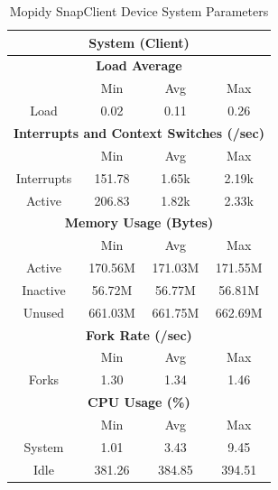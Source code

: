 \documentclass[11pt,a4paper,headinclude=false,footinclude=false]{scrreprt}
\begin{document}
\begin{table}[H]
\centering
    \begin{tabular}{||c|c|c|c|c|c|c||}
    \hline
    \multicolumn{7}{|c|}{\textbf{System (Client)}} \\
    \hline
    \multicolumn{7}{|c|}{\textbf{Load Average}} \\
    \hline\hline
      & \multicolumn{2}{|c|}{Min} & \multicolumn{2}{|c|}{Avg} & \multicolumn{2}{|c|}{Max} \\
    \hline
    Load & \multicolumn{2}{|c|}{0.02} & \multicolumn{2}{|c|}{0.11} & \multicolumn{2}{|c|}{0.26} \\
    \hline\hline
    \multicolumn{7}{|c|}{\textbf{Interrupts and Context Switches (/sec)}} \\
    \hline
      & \multicolumn{2}{|c|}{Min} & \multicolumn{2}{|c|}{Avg} & \multicolumn{2}{|c|}{Max} \\
    \hline
    Interrupts & \multicolumn{2}{|c|}{151.78} & \multicolumn{2}{|c|}{1.65k} & \multicolumn{2}{|c|}{2.19k} \\
    \hline
    Active & \multicolumn{2}{|c|}{206.83} & \multicolumn{2}{|c|}{1.82k} & \multicolumn{2}{|c|}{2.33k} \\
    \hline\hline
    \multicolumn{7}{|c|}{\textbf{Memory Usage (Bytes)}} \\
    \hline\hline
      & \multicolumn{2}{|c|}{Min} & \multicolumn{2}{|c|}{Avg} & \multicolumn{2}{|c|}{Max} \\
    \hline
    Active & \multicolumn{2}{|c|}{170.56M} & \multicolumn{2}{|c|}{171.03M} & \multicolumn{2}{|c|}{171.55M} \\
    \hline
    Inactive & \multicolumn{2}{|c|}{56.72M} & \multicolumn{2}{|c|}{56.77M} & \multicolumn{2}{|c|}{56.81M} \\
    \hline
    Unused & \multicolumn{2}{|c|}{661.03M} & \multicolumn{2}{|c|}{661.75M} & \multicolumn{2}{|c|}{662.69M} \\
    \hline\hline
    \multicolumn{7}{|c|}{\textbf{Fork Rate (/sec)}} \\
    \hline\hline
      & \multicolumn{2}{|c|}{Min} & \multicolumn{2}{|c|}{Avg} & \multicolumn{2}{|c|}{Max} \\
    \hline
    Forks & \multicolumn{2}{|c|}{1.30} & \multicolumn{2}{|c|}{1.34} & \multicolumn{2}{|c|}{1.46} \\
    \hline\hline
    \multicolumn{7}{|c|}{\textbf{CPU Usage (\%)}} \\
    \hline\hline
      & \multicolumn{2}{|c|}{Min} & \multicolumn{2}{|c|}{Avg} & \multicolumn{2}{|c|}{Max} \\
    \hline
    System & \multicolumn{2}{|c|}{1.01} & \multicolumn{2}{|c|}{3.43} & \multicolumn{2}{|c|}{9.45} \\
    \hline
    Idle & \multicolumn{2}{|c|}{381.26} & \multicolumn{2}{|c|}{384.85} & \multicolumn{2}{|c|}{394.51} \\
    \hline\hline
    \end{tabular}
    \caption{Mopidy SnapClient Device System Parameters}
    \label{MopidyclientSysTab}
\end{table}
\end{document}

